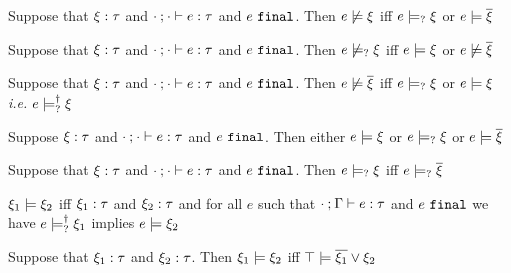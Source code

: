 \begin{lem}
  \label{lem:neg-satisfy}
  Suppose that $\xi : \tau$ and $\cdot \mathbin{;} \cdot \vdash e : \tau$ and $e ~\mathtt{final}$. Then $e \not\models \xi$ iff $e \models_{?} \xi$ or $e \models \overline{\xi}$
\end{lem}
\begin{lem}
  \label{lem:neg-possible-satisfy}
  Suppose that $\xi : \tau$ and $\cdot \mathbin{;} \cdot \vdash e : \tau$ and $e ~\mathtt{final}$. Then $e \not\models_{?} \xi$ iff $e \models \xi$ or $e \not\models \overline{\xi}$
\end{lem}
\begin{lem}
  \label{lem:neg-dual-satisfy}
  Suppose that $\xi : \tau$ and $\cdot \mathbin{;} \cdot \vdash e : \tau$ and $e ~\mathtt{final}$. Then $e \not\models \overline{\xi}$ iff $e \models_{?} \xi$ or $e \models \xi$ \textit{i.e.} $e \models_{?}^{\dag} \xi$
\end{lem}
\begin{lem}
  \label{lem:coverage-constraint-satisfy}
  Suppose $\xi : \tau$ and $\cdot \mathbin{;} \cdot \vdash e : \tau$ and $e ~\mathtt{final}$. Then either $e \models \xi$ or $e \models_{?} \xi$ or $e \models \overline{\xi}$
\end{lem}

\begin{corol}
  \label{corol:possible-satisfy-dual}
  Suppose that $\xi : \tau$ and $\cdot \mathbin{;} \cdot \vdash e : \tau$ and $e ~\mathtt{final}$. Then $e \models_{?} \xi$ iff $e \models_{?} \overline{\xi}$
\end{corol}

\begin{defn}
  \label{defn:const-entailment}
  $\xi_1 \models \xi_2$ iff $\xi_1 : \tau$ and $\xi_2 : \tau$ and for all $e$ such that $\cdot \mathbin{;} \Gamma \vdash e : \tau$ and $e ~\mathtt{final}$ we have $e \models_{?}^{\dag} \xi_1$ implies $e \models \xi_2$
\end{defn}
\begin{corol}
  \label{lem:material-entailment}
  Suppose that $\xi_1 : \tau$ and $\xi_2 : \tau$. Then $\xi_1 \models \xi_2$ iff $\top \models \overline{\xi_1} \vee \xi_2$
\end{corol}

